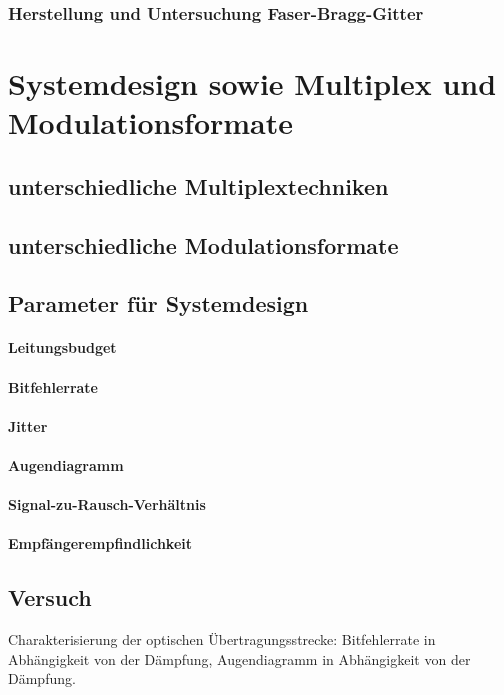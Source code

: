\documentclass[a4paper]{article}
\begin{document}
\subsubsection{Herstellung und Untersuchung Faser-Bragg-Gitter}


\newpage
\section{Systemdesign sowie Multiplex und Modulationsformate}
\subsection{unterschiedliche Multiplextechniken}
\subsection{unterschiedliche Modulationsformate}
\subsection{Parameter für Systemdesign}
\paragraph{Leitungsbudget}
\paragraph{Bitfehlerrate}
\paragraph{Jitter}
\paragraph{Augendiagramm}
\paragraph{Signal-zu-Rausch-Verhältnis}
\paragraph{Empfängerempfindlichkeit}

\subsection{Versuch}
Charakterisierung der optischen Übertragungsstrecke:
Bitfehlerrate in Abhängigkeit von der Dämpfung,
Augendiagramm in Abhängigkeit von der Dämpfung.
\end{document}
